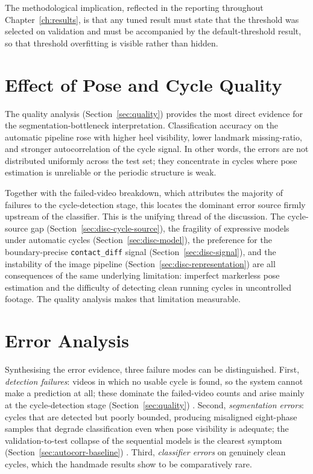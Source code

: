 The methodological
implication, reflected in the reporting throughout Chapter~\ref{ch:results}, is
that any tuned result must state that the threshold was selected on validation
and must be accompanied by the default-threshold result, so that threshold
overfitting is visible rather than hidden.

\section{Effect of Pose and Cycle Quality}
\label{sec:disc-quality}

The quality analysis (Section~\ref{sec:quality}) provides the most direct
evidence for the segmentation-bottleneck interpretation. Classification
accuracy on the automatic pipeline rose with higher heel visibility, lower
landmark missing-ratio, and stronger autocorrelation of the cycle signal. In
other words, the errors are not distributed uniformly across the test set; they
concentrate in cycles where pose estimation is unreliable or the periodic
structure is weak.

Together with the failed-video breakdown, which attributes
the majority of failures to the cycle-detection stage, this locates the
dominant error source firmly upstream of the classifier. This is the unifying thread of the discussion. The cycle-source gap
(Section~\ref{sec:disc-cycle-source}), the fragility of expressive models under
automatic cycles (Section~\ref{sec:disc-model}), the preference for the
boundary-precise \texttt{contact\_diff} signal
(Section~\ref{sec:disc-signal}), and the instability of the image pipeline
(Section~\ref{sec:disc-representation}) are all consequences of the same
underlying limitation: imperfect markerless pose estimation and the difficulty
of detecting clean running cycles in uncontrolled footage. The quality analysis
makes that limitation measurable.

\section{Error Analysis}
\label{sec:disc-error}

Synthesising the error evidence, three failure modes can be distinguished. First, \emph{detection failures}: videos in which no usable cycle is found, so
the system cannot make a prediction at all; these dominate the failed-video
counts and arise mainly at the cycle-detection stage
(Section~\ref{sec:quality}) . Second, \emph{segmentation errors}: cycles that are
detected but poorly bounded, producing misaligned eight-phase samples that
degrade classification even when pose visibility is adequate; the
validation-to-test collapse of the sequential models is the clearest symptom
(Section~\ref{sec:autocorr-baseline}) . Third, \emph{classifier errors} on
genuinely clean cycles, which the handmade results show to be comparatively
rare.

